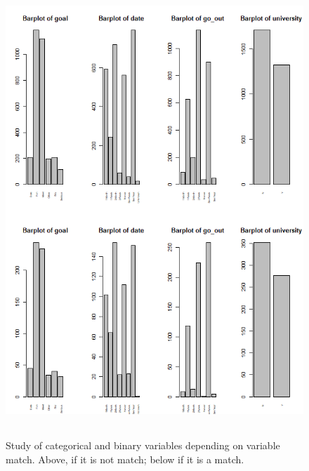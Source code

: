 \begin{figure}
  \centering
  \includegraphics[width= 16cm, height=17cm]{images/profiling/CPG_match_goal_university.png}
  \caption{Study of categorical and binary variables depending on variable match. Above, if it is not match; below if it is a match.}
  \label{fig:indiv}
\end{figure}

